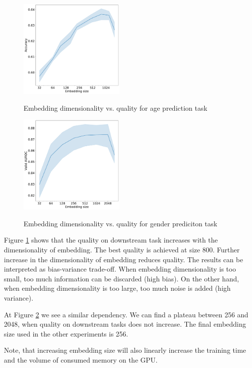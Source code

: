 \documentclass[sigconf, anonymous]{acmart}
\begin{document}
\begin{figure}[h]
  \caption{Embedding dimensionality vs. quality for age prediction task}
  \includegraphics[width=0.46\textwidth]{figures/age-pred-hidden-size.pdf}
  \label{fig-emb-dim-age}
\end{figure}

\begin{figure}[h]
  \caption{Embedding dimensionality vs. quality for gender prediciton task}
  \includegraphics[width=0.46\textwidth]{figures/gender-hidden-size.pdf}
  \label{fig-emb-dim-gender}
\end{figure}

Figure \ref{fig-emb-dim-age} shows that the quality on downstream task increases with the dimensionality of embedding. The best quality is achieved at size 800. Further increase in the dimensionality of embedding reduces quality.
The results can be interpreted as bias-variance trade-off. When embedding dimensionality is too small, too much information can be discarded (high bias). On the other hand, when embedding dimensionality is too large, too much noise is added (high variance).

At Figure \ref{fig-emb-dim-gender} we see a similar dependency. We can find a plateau between 256 and 2048, when quality on downstream tasks does not increase. The final embedding size used in the other experiments is 256.

Note, that increasing embedding size will also linearly increase the training time and the volume of consumed memory on the GPU.
\end{document}
